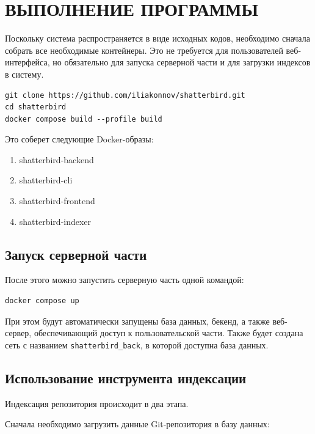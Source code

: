 \section{\uppercase{Выполнение программы}}

Поскольку система распространяется в виде исходных кодов, необходимо сначала собрать все необходимые контейнеры. Это не требуется для пользователей веб-интерфейса, но обязательно для запуска серверной части и для загрузки индексов в систему.

\begin{lstlisting}
git clone https://github.com/iliakonnov/shatterbird.git
cd shatterbird
docker compose build --profile build
\end{lstlisting}

Это соберет следующие Docker-образы:
\begin{enumerate}
    \item shatterbird-backend
    \item shatterbird-cli
    \item shatterbird-frontend
    \item shatterbird-indexer
\end{enumerate}

\subsection{Запуск серверной части}

После этого можно запустить серверную часть одной командой:
\begin{lstlisting}
docker compose up
\end{lstlisting}

При этом будут автоматически запущены база данных, бекенд, а также веб-сервер, обеспечивающий доступ к пользовательской части. Также будет создана сеть с названием \texttt{shatterbird\_back}, в которой доступна база данных.

\subsection{Использование инструмента индексации}

Индексация репозитория происходит в два этапа.

Сначала необходимо загрузить данные Git-репозитория в базу данных:

